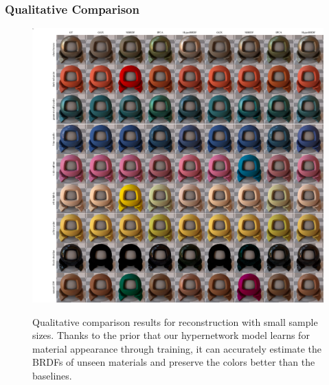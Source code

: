 \subsubsection{Qualitative Comparison}\label{sec:qual_comp}
\begin{figure}[t]
  \centering

  
 {\includegraphics[width=0.9\linewidth]{Chapters/hyperbrdf-figs/qual_comp_ggx_2.pdf}}
\\
   \caption{Qualitative comparison results for reconstruction with small sample sizes. Thanks to the prior that our hypernetwork model learns for material appearance through training, it can accurately estimate the BRDFs of unseen materials and preserve the colors better than the baselines.}  


\end{figure}

